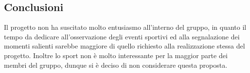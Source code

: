 \documentclass[../studio-di-fattibilita.tex]{subfiles}
\begin{document}
\subsection{Conclusioni}%
\label{subsec:conclusioni}
Il progetto non ha suscitato molto entusiasmo all'interno del gruppo, in quanto il tempo da dedicare all'osservazione degli eventi sportivi ed alla segnalazione dei momenti salienti sarebbe maggiore di quello richiesto alla realizzazione stessa del progetto. Inoltre lo sport non è molto interessante per la maggior parte dei membri del gruppo, dunque si è deciso di non considerare questa proposta.
\end{document}
